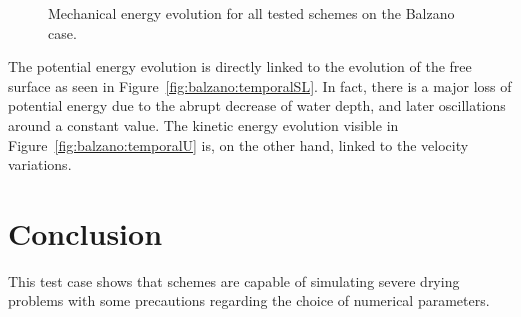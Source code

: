 \begin{figure}[H]
  \centering
  \caption{Mechanical energy evolution for all tested schemes on the Balzano case.}
\label{fig:balzano:Em}
\end{figure}

The potential energy evolution is directly linked to the evolution of the free
surface as seen in Figure~\ref{fig:balzano:temporalSL}.
In fact, there is a major loss of potential energy due to the abrupt decrease of
water depth, and later oscillations around a constant value.
The kinetic energy evolution visible in Figure~\ref{fig:balzano:temporalU} is,
on the other hand, linked to the velocity variations.


%
\section{Conclusion}

This test case shows that  schemes are capable of simulating severe drying problems
with some precautions regarding the choice of numerical parameters.


